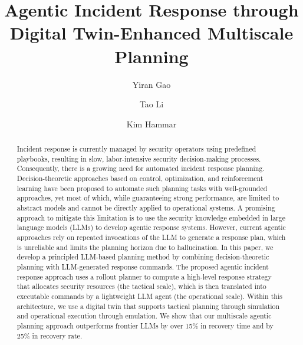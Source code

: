 \documentclass[runningheads,10pt]{llncs}
\begin{document}
\title{Agentic Incident Response through Digital Twin-Enhanced Multiscale Planning}

\author{Yiran Gao \and Tao Li \and Kim Hammar}


%
\maketitle  

\begin{abstract}
Incident response is currently managed by security operators using predefined playbooks, resulting in slow, labor-intensive security decision-making processes. Consequently, there is a growing need for automated incident response planning.  Decision-theoretic approaches based on control, optimization, and reinforcement learning have been proposed to automate such planning tasks with well-grounded approaches, yet most of which, while guaranteeing strong performance, are limited to abstract models and cannot be directly applied to operational systems. A promising approach to mitigate this limitation is to use the security knowledge embedded in large language models (LLMs) to develop agentic response systems. However, current agentic approaches rely on repeated invocations of the LLM to generate a response plan, which is unreliable and limits the planning horizon due to hallucination. In this paper, we develop a principled LLM-based planning method by combining decision-theoretic planning with LLM-generated response commands. The proposed agentic incident response approach uses a rollout planner to compute a high-level response strategy that allocates security resources (the tactical scale), which is then translated into executable commands by a lightweight LLM agent (the operational scale). Within this architecture, we use a digital twin that supports tactical planning through simulation and operational execution through emulation. We show that our multiscale agentic planning approach outperforms frontier LLMs by over 15\% in recovery time and by 25\% in recovery rate.

\end{abstract}
\end{document}
